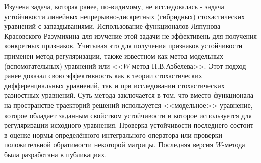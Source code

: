 Изучена задача, которая ранее, по-видимому, не исследовалась -
задача устойчивости линейных непрерывно-дискретных (гибридных)
стохастических уравнений с запаздываниями. Использование
функционалов Ляпунова-Красовского-Разумихина для изучение этой
задачи не эффективень  для получения конкретных признаков. Учитывая
это для получения признаков устойчивости применен метод
регуляризации, также известном как метод модельных (вспомогательных)
уравнений или <<$W$-метод Н.В.Азбелева>>. Этот подход ранее доказал
свою эффективность как в теории стохастических дифференциальных
уравнений, так и при исследовании стохастических разностных
уравнений. Суть метода заключается в том, что вместо функционала на
пространстве траекторий решений используется <<модельное>>
уравнение, которое обладает заданным свойством устойчивости и
которое используется для регуляризации исходного уравнения. Проверка
устойчивости последнего состоит в оценке нормы определённого
интегрального оператора или проверки положительной обратимости
некоторой матрицы. Последняя версия $W$-метода была разработана в
публикациях.
\smallskip

